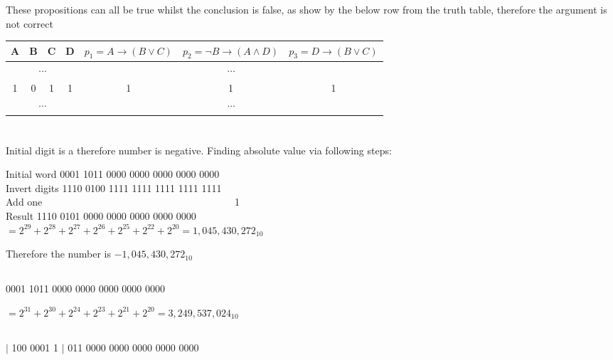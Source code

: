 \documentclass[10pt]{article} %
\begin{document}
These propositions can all be true whilst the conclusion is false, as show by the below row from the truth table, therefore the argument is not correct

\vspace{20px}

\begin{tabular}{c|c|c|c||c|c|c}
A & B & C & D & $p_1 = A \to (B\vee C)$ & $p_2= \neg B \to (A \wedge D)$ & $p_3= D \to (B \vee C)$ \\
\hline
\multicolumn{4}{c||}{$\cdots$} & \multicolumn{3}{c}{$\cdots$} \\
1 & 0 & 1 & 1 & 1 & 1 & 1\\
\multicolumn{4}{c||}{$\cdots$} & \multicolumn{3}{c}{$\cdots$} \\
\hline
\end{tabular}
\section{}
\subsection{}

Initial digit is a {} therefore number is negative. Finding absolute value via following steps:
\begin {tabbing}
Initial word \hspace{30px} \= { 0001 1011 0000 0000 0000 0000 0000} \\
Invert digits \>   { 1110 0100 1111 1111 1111 1111 1111} \\
Add one \> {\ttfamily \ \ \ \ \ \ \ \ \ \ \ \ \ \ \ \ \ \ \ \ \ \ \ \ \ \ \ \ \ \ \ \ \ \ \ \ \ \ 1}\\
Result \> { 1110 0101 0000 0000 0000 0000 0000} \\
\> $=2^{29}+2^{28}+2^{27}+2^{26}+2^{25}+2^{22}+2^{20}=1,045,430,272_{10}$ 
\end{tabbing}
Therefore the number is $-1,045,430,272_{10}$
\subsection{}
\begin{center}
{ 0001 1011 0000 0000 0000 0000 0000}

$=2^{31}+2^{30}+2^{24}+2^{23} + 2^{21} + 2^{20}=3,249,537,024_{10}$
\end{center}
\subsection{}
\begin{center}
{ $\Big|$ 100 0001 1 $\Big|$ 011 0000 0000 0000 0000 0000}
\end{center}
\end{document}
